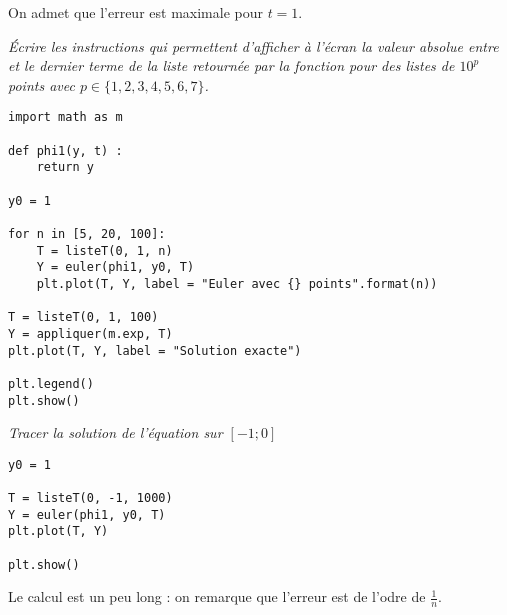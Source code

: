 On admet que l'erreur est maximale pour $t=1$.
\begin{Exercise}[title = {Qualité de l'approximation}]\it
Écrire les instructions qui permettent d'afficher à l'écran la valeur absolue entre  et le dernier terme de la liste retournée par la fonction  pour des listes de $10^p$ points avec $p\in \{1, 2, 3, 4, 5,6, 7\}$.
\end{Exercise}
\begin{Answer}
\begin{lstlisting}
import math as m

def phi1(y, t) :
    return y

y0 = 1

for n in [5, 20, 100]:
    T = listeT(0, 1, n)
    Y = euler(phi1, y0, T)
    plt.plot(T, Y, label = "Euler avec {} points".format(n))

T = listeT(0, 1, 100)
Y = appliquer(m.exp, T)
plt.plot(T, Y, label = "Solution exacte")

plt.legend()
plt.show()
\end{lstlisting}
\end{Answer}
\begin{Exercise}[title = {Revenir en arrière}]\it
Tracer la solution de l'équation sur $[-1;0]$
\end{Exercise}
\begin{Answer}
\begin{lstlisting}
y0 = 1

T = listeT(0, -1, 1000)
Y = euler(phi1, y0, T)
plt.plot(T, Y)

plt.show()
\end{lstlisting}
\newpage
\end{Answer}
Le calcul est un peu long : on remarque que l'erreur est de l'odre de $\frac 1n$.
